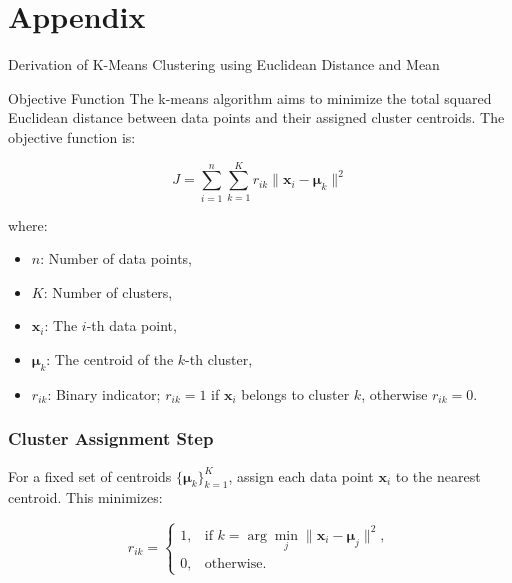 \documentclass[12pt,twoside,a4paper,parskip]{scrbook} %
\begin{document}















\backmatter
\appendix
\chapter{Appendix}\label{appendix}

Derivation of K-Means Clustering using Euclidean Distance and Mean

Objective Function
The k-means algorithm aims to minimize the total squared Euclidean distance between data points and their assigned cluster centroids. The objective function is:

\[
J = \sum_{i=1}^{n} \sum_{k=1}^{K} r_{ik} \| \mathbf{x}_i - \boldsymbol{\mu}_k \|^2
\]

where:
\begin{itemize}
    \item \( n \): Number of data points,
    \item \( K \): Number of clusters,
    \item \( \mathbf{x}_i \): The \( i \)-th data point,
    \item \( \boldsymbol{\mu}_k \): The centroid of the \( k \)-th cluster,
    \item \( r_{ik} \): Binary indicator; \( r_{ik} = 1 \) if \( \mathbf{x}_i \) belongs to cluster \( k \), otherwise \( r_{ik} = 0 \).
\end{itemize}

\subsection*{Cluster Assignment Step}
For a fixed set of centroids \( \{ \boldsymbol{\mu}_k \}_{k=1}^K \), assign each data point \( \mathbf{x}_i \) to the nearest centroid. This minimizes:

\[
r_{ik} =
\begin{cases} 
1, & \text{if } k = \arg\min_{j} \| \mathbf{x}_i - \boldsymbol{\mu}_j \|^2, \\
0, & \text{otherwise.}
\end{cases}
\]
\end{document}
